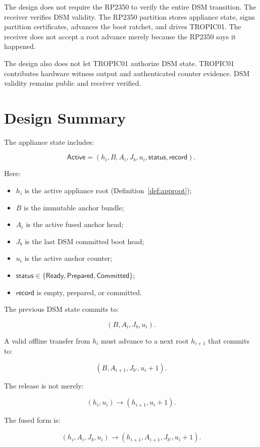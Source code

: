 \documentclass[11pt]{article}
\theoremstyle{definition}
\theoremstyle{remark}
\newcommand{\Active}{\ensuremath{\mathsf{Active}}}
\newcommand{\Ready}{\ensuremath{\mathsf{Ready}}}
\newcommand{\Prepared}{\ensuremath{\mathsf{Prepared}}}
\newcommand{\Committed}{\ensuremath{\mathsf{Committed}}}
\newcommand{\Bundle}{\ensuremath{B}}
\newcommand{\Ahead}{\ensuremath{A}}
\newcommand{\Bhead}{\ensuremath{J}}
\begin{document}
The design does not require the RP2350 to verify the entire DSM transition. The receiver verifies
DSM validity. The RP2350 partition stores appliance state, signs partition certificates, advances
the boot ratchet, and drives TROPIC01. The receiver does not accept a root advance merely because
the RP2350 says it happened.

The design also does not let TROPIC01 authorize DSM state. TROPIC01 contributes hardware witness
output and authenticated counter evidence. DSM validity remains public and receiver verified.

\section{Design Summary}

The appliance state includes:

\[
\Active =
(
h_i,
\Bundle,
\Ahead_i,
\Bhead_b,
u_i,
\mathsf{status},
\mathsf{record}
).
\]

Here:

\begin{itemize}
\item \(h_i\) is the active appliance root (Definition~\ref{def:approot});
\item \(\Bundle\) is the immutable anchor bundle;
\item \(\Ahead_i\) is the active fused anchor head;
\item \(\Bhead_b\) is the last DSM committed boot head;
\item \(u_i\) is the active anchor counter;
\item \(\mathsf{status}\in\{\Ready,\Prepared,\Committed\}\);
\item \(\mathsf{record}\) is empty, prepared, or committed.
\end{itemize}

The previous DSM state commits to:

\[
(
\Bundle,
\Ahead_i,
\Bhead_b,
u_i
).
\]

A valid offline transfer from \(h_i\) must advance to a next root \(h_{i+1}\) that commits to:

\[
(
\Bundle,
\Ahead_{i+1},
\Bhead_{b'},
u_i+1
).
\]

The release is not merely:

\[
(h_i,u_i)\rightarrow(h_{i+1},u_i+1).
\]

The fused form is:

\[
(h_i,\Ahead_i,\Bhead_b,u_i)
\rightarrow
(h_{i+1},\Ahead_{i+1},\Bhead_{b'},u_i+1).
\]
\end{document}
